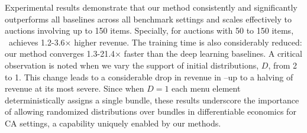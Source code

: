 Experimental results demonstrate that our method consistently and significantly outperforms all baselines across all benchmark settings and scales effectively to auctions involving up to 150 items. Specially, for auctions with 50 to 150 items, \name~achieves 1.2-3.6$\times$ higher revenue. The training time is also considerably reduced: our method converges 1.3-21.4$\times$ faster than the deep learning baselines. A critical observation is noted when we vary the support of initial distributions, $D$, from 2 to 1. This change leads to a considerable drop in revenue in \name--up to a halving of revenue at its most severe. Since when $D=1$ each menu element deterministically assigns a single bundle, these results underscore the importance of allowing randomized distributions over bundles in differentiable economics for CA settings, a capability uniquely enabled by our methods.




